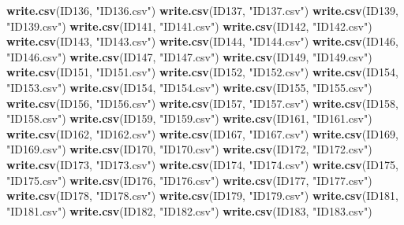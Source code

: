 \documentclass[
]{book}
\newenvironment{Shaded}{\begin{snugshade}}{\end{snugshade}}
\newcommand{\KeywordTok}[1]{\textcolor[rgb]{0.13,0.29,0.53}{\textbf{#1}}}
\newcommand{\NormalTok}[1]{#1}
\newcommand{\StringTok}[1]{\textcolor[rgb]{0.31,0.60,0.02}{#1}}
\begin{document}
\begin{Shaded}
\begin{Highlighting}[]
{{{{{{\KeywordTok{write.csv}\NormalTok{(ID136, }\StringTok{"ID136.csv"}\NormalTok{)}
\KeywordTok{write.csv}\NormalTok{(ID137, }\StringTok{"ID137.csv"}\NormalTok{)}
\KeywordTok{write.csv}\NormalTok{(ID139, }\StringTok{"ID139.csv"}\NormalTok{)}
\KeywordTok{write.csv}\NormalTok{(ID141, }\StringTok{"ID141.csv"}\NormalTok{)}
\KeywordTok{write.csv}\NormalTok{(ID142, }\StringTok{"ID142.csv"}\NormalTok{)}
\KeywordTok{write.csv}\NormalTok{(ID143, }\StringTok{"ID143.csv"}\NormalTok{)}
\KeywordTok{write.csv}\NormalTok{(ID144, }\StringTok{"ID144.csv"}\NormalTok{)}
\KeywordTok{write.csv}\NormalTok{(ID146, }\StringTok{"ID146.csv"}\NormalTok{)}
\KeywordTok{write.csv}\NormalTok{(ID147, }\StringTok{"ID147.csv"}\NormalTok{)}
\KeywordTok{write.csv}\NormalTok{(ID149, }\StringTok{"ID149.csv"}\NormalTok{)}
\KeywordTok{write.csv}\NormalTok{(ID151, }\StringTok{"ID151.csv"}\NormalTok{)}
\KeywordTok{write.csv}\NormalTok{(ID152, }\StringTok{"ID152.csv"}\NormalTok{)}
\KeywordTok{write.csv}\NormalTok{(ID154, }\StringTok{"ID153.csv"}\NormalTok{)}
\KeywordTok{write.csv}\NormalTok{(ID154, }\StringTok{"ID154.csv"}\NormalTok{)}
\KeywordTok{write.csv}\NormalTok{(ID155, }\StringTok{"ID155.csv"}\NormalTok{)}
\KeywordTok{write.csv}\NormalTok{(ID156, }\StringTok{"ID156.csv"}\NormalTok{)}
\KeywordTok{write.csv}\NormalTok{(ID157, }\StringTok{"ID157.csv"}\NormalTok{)}
\KeywordTok{write.csv}\NormalTok{(ID158, }\StringTok{"ID158.csv"}\NormalTok{)}
\KeywordTok{write.csv}\NormalTok{(ID159, }\StringTok{"ID159.csv"}\NormalTok{)}
\KeywordTok{write.csv}\NormalTok{(ID161, }\StringTok{"ID161.csv"}\NormalTok{)}
\KeywordTok{write.csv}\NormalTok{(ID162, }\StringTok{"ID162.csv"}\NormalTok{)}
\KeywordTok{write.csv}\NormalTok{(ID167, }\StringTok{"ID167.csv"}\NormalTok{)}
\KeywordTok{write.csv}\NormalTok{(ID169, }\StringTok{"ID169.csv"}\NormalTok{)}
\KeywordTok{write.csv}\NormalTok{(ID170, }\StringTok{"ID170.csv"}\NormalTok{)}
\KeywordTok{write.csv}\NormalTok{(ID172, }\StringTok{"ID172.csv"}\NormalTok{)}
\KeywordTok{write.csv}\NormalTok{(ID173, }\StringTok{"ID173.csv"}\NormalTok{)}
\KeywordTok{write.csv}\NormalTok{(ID174, }\StringTok{"ID174.csv"}\NormalTok{)}
\KeywordTok{write.csv}\NormalTok{(ID175, }\StringTok{"ID175.csv"}\NormalTok{)}
\KeywordTok{write.csv}\NormalTok{(ID176, }\StringTok{"ID176.csv"}\NormalTok{)}
\KeywordTok{write.csv}\NormalTok{(ID177, }\StringTok{"ID177.csv"}\NormalTok{)}
\KeywordTok{write.csv}\NormalTok{(ID178, }\StringTok{"ID178.csv"}\NormalTok{)}
\KeywordTok{write.csv}\NormalTok{(ID179, }\StringTok{"ID179.csv"}\NormalTok{)}
\KeywordTok{write.csv}\NormalTok{(ID181, }\StringTok{"ID181.csv"}\NormalTok{)}
\KeywordTok{write.csv}\NormalTok{(ID182, }\StringTok{"ID182.csv"}\NormalTok{)}
\KeywordTok{write.csv}\NormalTok{(ID183, }\StringTok{"ID183.csv"}\NormalTok{)}

}}}}}}
\end{Highlighting}
\end{Shaded}
\end{document}

